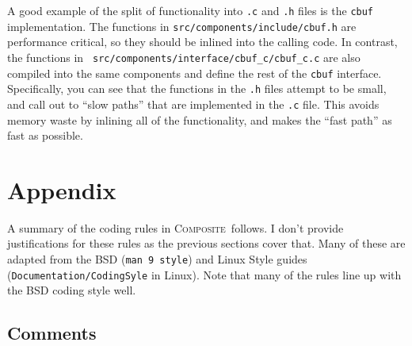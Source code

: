 \documentclass[11pt,onecolumn]{article}
\def\composite{\textsc{Composite}}
\newcommand{\head}[1]{\vspace{0.4em}\noindent{\bf #1}}
\begin{document}
\head{Example.}  A good example of the split of functionality into
     {\tt .c} and {\tt .h} files is the {\tt cbuf} implementation.
     The functions in {\tt src/components/include/cbuf.h} are
     performance critical, so they should be inlined into the calling
     code.  In contrast, the functions in {\tt
       src/components/interface/cbuf\_c/cbuf\_c.c} are also compiled
     into the same components and define the rest of the {\tt cbuf}
     interface.  Specifically, you can see that the functions in the
     {\tt .h} files attempt to be small, and call out to ``slow
     paths'' that are implemented in the {\tt .c} file.  This avoids
     memory waste by inlining all of the functionality, and makes the
     ``fast path'' as fast as possible.





\section{Appendix}
\label{s:appendix}

A summary of the coding rules in \composite\ follows.  I don't provide
justifications for these rules as the previous sections cover that.
Many of these are adapted from the BSD ({\tt man 9 style}) and Linux
Style guides ({\tt Documentation/CodingSyle} in Linux).  Note that
many of the rules line up with the BSD coding style well.

\subsection{Comments}
\end{document}
